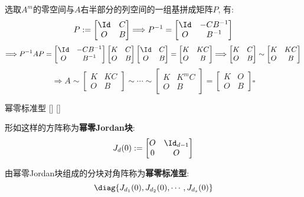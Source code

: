 \documentclass[UTF8]{ctexart}
\begin{document}
\begin{prf}
			选取$A^m$的零空间与$A$右半部分的列空间的一组基拼成矩阵$P$, 有: 
			\[P:=
			\begin{bmatrix}
				\Id & C\\
				O & B
			\end{bmatrix}
			\Longrightarrow
			P^{-1}=
			\begin{bmatrix}
				\Id & -C B^{-1}\\
				O & B^{-1}
			\end{bmatrix}\]
			\[\Longrightarrow P^{-1}AP=
			\begin{bmatrix}
				\Id & -C B^{-1}\\
				O & B^{-1}
			\end{bmatrix}
			\begin{bmatrix}
				K & C\\
				O & B
			\end{bmatrix}
			\begin{bmatrix}
				\Id & C\\
				O & B
			\end{bmatrix}
			=
			\begin{bmatrix}
				K & KC\\
				O & B
			\end{bmatrix}
			\Longrightarrow
			\begin{bmatrix}
				K & C\\
				O & B
			\end{bmatrix}
			\sim
			\begin{bmatrix}
				K & KC\\
				O & B
			\end{bmatrix}\]
			\[\Longrightarrow
			A\sim
			\begin{bmatrix}
				K & KC\\
				O & B
			\end{bmatrix}
			\sim
			\cdots
			\sim
			\begin{bmatrix}
				K & K^m C\\
				O & B
			\end{bmatrix}
			=
			\begin{bmatrix}
				K & O\\
				O & B
			\end{bmatrix}\square\]
		\end{prf}
		
		\begin{dfn}
			[]
			{幂零标准型}
			[]
			[]

			形如这样的方阵称为\textbf{幂零Jordan块}: 
			\[J_d(0):=
			\begin{bmatrix}
				O & \Id_{d-1}\\
				0 & O
			\end{bmatrix}\]

			由幂零Jordan块组成的分块对角阵称为\textbf{幂零标准型}: 
			\[\diag\{J_{d_1}(0),J_{d_2}(0),\cdots,J_{d_s}(0)\}\]
		\end{dfn}
		
\end{document}

